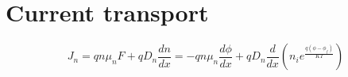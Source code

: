 \chapter{Current transport} %
\label{cha:current_transport}

\begin{equation}
	J_n=qn\mu_nF+qD_n\frac{dn}{dx} = -qn\mu_n\frac{d\phi}{dx}+qD_n\frac{d}{dx}(n_ie^{\frac{q(\phi-\phi_f)}{KT}}) 
\end{equation}
